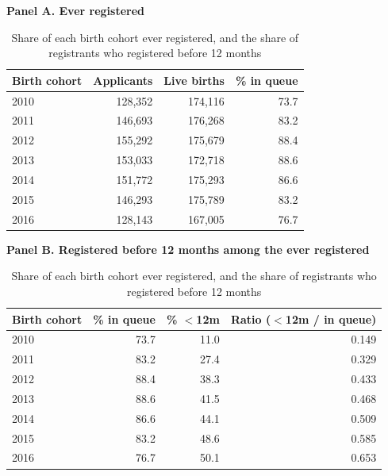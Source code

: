 \begin{table}[htbp]\centering
\caption{Share of each birth cohort ever registered, and the share of registrants who registered before 12 months}
\label{tab:S8a}
\label{tab:S8c}
\footnotesize
\par\medskip\textbf{Panel A. Ever registered}\par\smallskip
\begin{tabular}{lrrr}
\toprule
Birth cohort & Applicants & Live births & \% in queue \\
\midrule
2010 & 128,352 & 174,116 & 73.7 \\
2011 & 146,693 & 176,268 & 83.2 \\
2012 & 155,292 & 175,679 & 88.4 \\
2013 & 153,033 & 172,718 & 88.6 \\
2014 & 151,772 & 175,293 & 86.6 \\
2015 & 146,293 & 175,789 & 83.2 \\
2016 & 128,143 & 167,005 & 76.7 \\
\bottomrule
\end{tabular}
\par\medskip\textbf{Panel B. Registered before 12 months among the ever registered}\par\smallskip
\begin{tabular}{lrrr}
\toprule
Birth cohort & \% in queue & \% $<$12m & Ratio ($<$12m / in queue) \\
\midrule
2010 & 73.7 & 11.0 & 0.149 \\
2011 & 83.2 & 27.4 & 0.329 \\
2012 & 88.4 & 38.3 & 0.433 \\
2013 & 88.6 & 41.5 & 0.468 \\
2014 & 86.6 & 44.1 & 0.509 \\
2015 & 83.2 & 48.6 & 0.585 \\
2016 & 76.7 & 50.1 & 0.653 \\
\bottomrule
\end{tabular}
\end{table}
